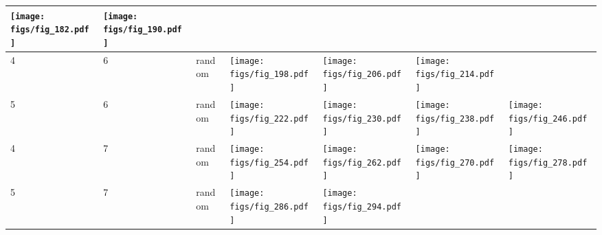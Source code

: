\documentclass[oneside,canadian,landscape]{article}
\begin{document}
\begin{center}
\begin{longtable}{|l|l|l||l|l|l|l|}
\begin{minipage}{3.5cm}
\texttt{[image: figs/fig\_182.pdf]}
\end{minipage}
&\begin{minipage}{3.5cm}
\texttt{[image: figs/fig\_190.pdf]}
\end{minipage}
&\\ \hline
4&6&random&\begin{minipage}{3.5cm}
\texttt{[image: figs/fig\_198.pdf]}
\end{minipage}
&\begin{minipage}{3.5cm}
\texttt{[image: figs/fig\_206.pdf]}
\end{minipage}
&\begin{minipage}{3.5cm}
\texttt{[image: figs/fig\_214.pdf]}
\end{minipage}
&\\ \hline
5&6&random&\begin{minipage}{3.5cm}
\texttt{[image: figs/fig\_222.pdf]}
\end{minipage}
&\begin{minipage}{3.5cm}
\texttt{[image: figs/fig\_230.pdf]}
\end{minipage}
&\begin{minipage}{3.5cm}
\texttt{[image: figs/fig\_238.pdf]}
\end{minipage}
&\begin{minipage}{3.5cm}
\texttt{[image: figs/fig\_246.pdf]}
\end{minipage}
\\ \hline
4&7&random&\begin{minipage}{3.5cm}
\texttt{[image: figs/fig\_254.pdf]}
\end{minipage}
&\begin{minipage}{3.5cm}
\texttt{[image: figs/fig\_262.pdf]}
\end{minipage}
&\begin{minipage}{3.5cm}
\texttt{[image: figs/fig\_270.pdf]}
\end{minipage}
&\begin{minipage}{3.5cm}
\texttt{[image: figs/fig\_278.pdf]}
\end{minipage}
\\ \hline
5&7&random&\begin{minipage}{3.5cm}
\texttt{[image: figs/fig\_286.pdf]}
\end{minipage}
&\begin{minipage}{3.5cm}
\texttt{[image: figs/fig\_294.pdf]}

\end{minipage}
\end{longtable}
\end{center}
\end{document}

